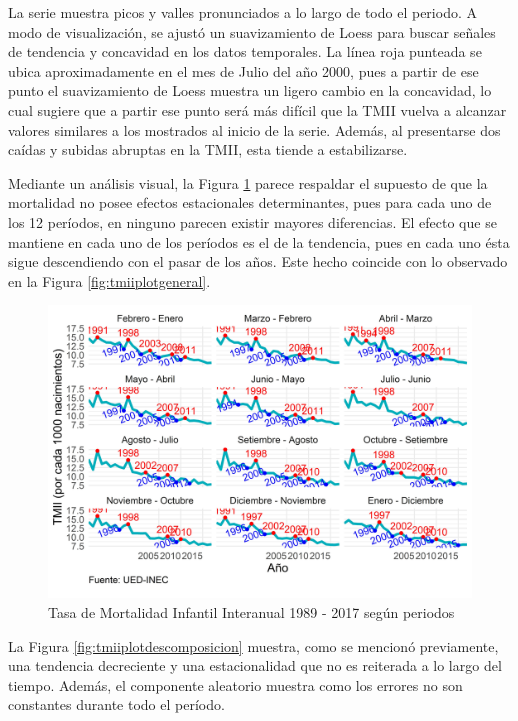 \documentclass[
]{article}
\begin{document}
La serie muestra picos y valles pronunciados a lo largo de todo el
periodo. A modo de visualización, se ajustó un suavizamiento de Loess
para buscar señales de tendencia y concavidad en los datos temporales.
La línea roja punteada se ubica aproximadamente en el mes de Julio del
año 2000, pues a partir de ese punto el suavizamiento de Loess muestra
un ligero cambio en la concavidad, lo cual sugiere que a partir ese
punto será más difícil que la TMII vuelva a alcanzar valores similares a
los mostrados al inicio de la serie. Además, al presentarse dos caídas y
subidas abruptas en la TMII, esta tiende a estabilizarse.

Mediante un análisis visual, la Figura \ref{fig:tmiiplotperiodos} parece
respaldar el supuesto de que la mortalidad no posee efectos estacionales
determinantes, pues para cada uno de los 12 períodos, en ninguno parecen
existir mayores diferencias. El efecto que se mantiene en cada uno de
los períodos es el de la tendencia, pues en cada uno ésta sigue
descendiendo con el pasar de los años. Este hecho coincide con lo
observado en la Figura \ref{fig:tmiiplotgeneral}.

\begin{figure}[H]
\includegraphics[width=1\linewidth,height=1\textheight]{Tesis_files/figure-latex/tmiiplotperiodos-1} \caption{Tasa de Mortalidad Infantil Interanual 1989 - 2017 según periodos}\label{fig:tmiiplotperiodos}
\end{figure}

La Figura \ref{fig:tmiiplotdescomposicion} muestra, como se mencionó
previamente, una tendencia decreciente y una estacionalidad que no es
reiterada a lo largo del tiempo. Además, el componente aleatorio muestra
como los errores no son constantes durante todo el período.
\end{document}
